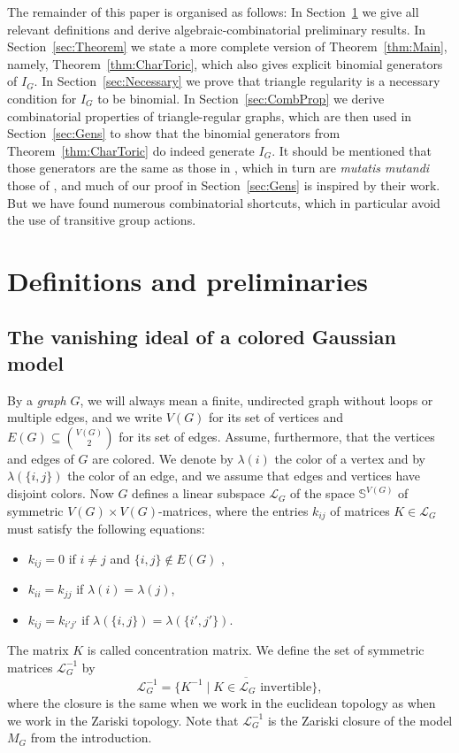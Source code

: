 \documentclass[a4paper, 11pt]{amsart}
\numberwithin{theorem}{section}
\def\S{{\mathbb S}}
\begin{document}
The remainder of this paper is organised as follows: In
Section~\ref{sec:Definitions} we give all relevant definitions and derive
algebraic-combinatorial preliminary results. In Section~\ref{sec:Theorem}
we state a more complete version of Theorem~\ref{thm:Main}, namely,
Theorem~\ref{thm:CharToric}, which also gives explicit binomial generators
of $I_G$. In Section~\ref{sec:Necessary} we prove that triangle
regularity is a necessary condition for $I_G$ to be binomial. In
Section~\ref{sec:CombProp} we derive combinatorial properties of
triangle-regular graphs, which are then used in Section~\ref{sec:Gens}
to show that the binomial generators from Theorem~\ref{thm:CharToric} do
indeed generate $I_G$. It should be mentioned that those generators are the
same as those in \cite{CMMPS23}, which in turn are {\em mutatis mutandi}
those of \cite{MS21}, and much of our proof in Section~\ref{sec:Gens}
is inspired by their work. But we have found numerous combinatorial
shortcuts, which in particular avoid the use of transitive group actions.

\section{Definitions and preliminaries} \label{sec:Definitions}

\subsection{The vanishing ideal of a colored Gaussian model}

By a {\em graph} $G$, we will always mean a finite, undirected graph
without loops or multiple edges, 
and we write $V(G)$ for its set of vertices and $E(G) \subseteq
\binom{V(G)}{2}$ for its set of
edges. Assume, furthermore, that the vertices and edges of $G$ are
colored. We denote by $\lambda (i)$ the
color of a vertex and by $\lambda (\{i,j\})$ the color of an edge, and
we assume that edges and vertices have disjoint colors. Now $G$
defines a linear subspace $\mathcal{L}_G$ of the space 
$\S ^{V(G)}$ of symmetric $V(G) \times V(G)$-matrices, 
where the entries $k_{ij}$ of matrices $K \in \mathcal{L}_{G}$ must satisfy the following equations:
\begin{itemize}
    \item $k_{ij} = 0$ if $i \neq j$ and $\{i,j\}\not \in E(G)$ ,
    \item $k_{ii} = k_{jj}$ if $\lambda (i) = \lambda (j)$,
    \item $k_{ij} = k_{i'j'}$ if $\lambda (\{i,j\}) = \lambda (\{i',j'\})$.
\end{itemize}
The matrix $K $ is called concentration matrix. We define the set of symmetric matrices $\mathcal{L}_G^{-1}$ by
\[
\mathcal{L}_G ^{-1} = \overline{\{K^{-1} \mid K \in \mathcal{L}_G
\text{ invertible}\}},
\]
where the closure is the same when we work in the euclidean topology
as when we work in the Zariski topology. Note that
$\mathcal{L}_G^{-1}$ is the Zariski closure of the model $M_G$ from
the introduction. 
\end{document}
